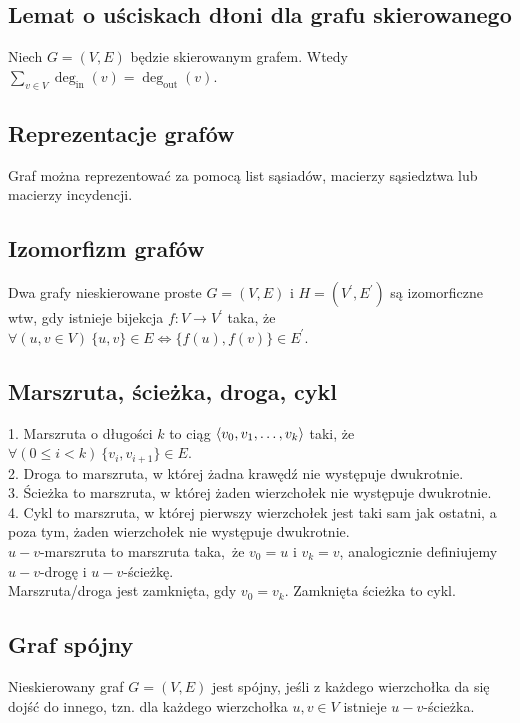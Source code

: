 \subsection*{Lemat o uściskach dłoni dla grafu skierowanego}
Niech $G = (V, E)$ będzie skierowanym grafem. Wtedy
$\sum\limits_{v \in V} \deg_\text{in}(v) = \deg_\text{out}(v)$.

\subsection*{Reprezentacje grafów}
Graf można reprezentować za pomocą list sąsiadów, macierzy sąsiedztwa lub macierzy
incydencji.

\subsection*{Izomorfizm grafów}
Dwa grafy nieskierowane proste $G = (V, E)$ i $H = (V^\prime, E^\prime)$ są
izomorficzne wtw, gdy istnieje bijekcja $f: V \to V^\prime$ taka, że
$\forall(u, v \in V) \ \{ u,v \} \in E \Leftrightarrow \{ f(u), f(v) \} \in E^\prime$.

\subsection*{Marszruta, ścieżka, droga, cykl}
1. Marszruta o długości $k$ to ciąg $\left\langle v_0, v_1, \ldots, v_k \right\rangle$ taki, że \\
$\forall(0 \leq i < k) \ \{ v_i, v_{i+1} \} \in E$. \\
2. Droga to marszruta, w której żadna krawędź nie występuje dwukrotnie. \\
3. Ścieżka to marszruta, w której żaden wierzchołek nie występuje dwukrotnie. \\
4. Cykl to marszruta, w której pierwszy wierzchołek jest taki sam jak ostatni,
a poza tym, żaden wierzchołek nie występuje dwukrotnie.\\
$u-v$-marszruta to marszruta taka, że $v_0 = u$ i $v_k = v$, analogicznie 
definiujemy $u-v$-drogę i $u-v$-ścieżkę. \\
Marszruta/droga jest zamknięta, gdy $v_0 = v_k$. Zamknięta ścieżka to cykl.

\subsection*{Graf spójny}
Nieskierowany graf $G = (V, E)$ jest spójny, jeśli z każdego wierzchołka da się
dojść do innego, tzn. dla każdego wierzchołka $u,v \in V$ istnieje $u-v$-ścieżka.

